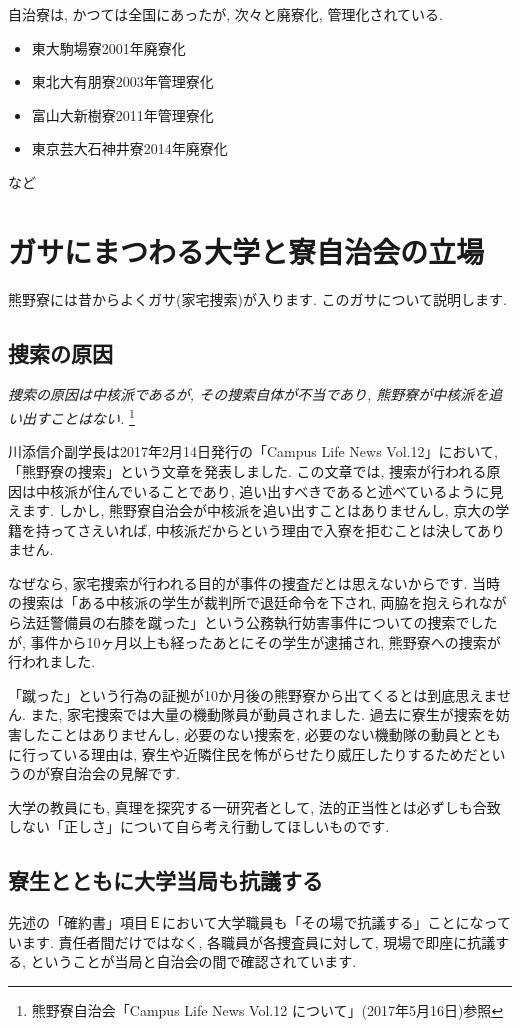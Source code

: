 \documentclass[10pt,b5jsbook,dvips,dvipdfmx,openany]{jsbook}
\theoremstyle{definition}
\begin{document}
		自治寮は, かつては全国にあったが, 次々と廃寮化, 管理化されている. 
		\begin{itemize}
		\item 東大駒場寮2001年廃寮化
		\item 東北大有朋寮2003年管理寮化
		\item 富山大新樹寮2011年管理寮化
		\item 東京芸大石神井寮2014年廃寮化
		\end{itemize}
		など




	\section{ガサにまつわる大学と寮自治会の立場}
	熊野寮には昔からよくガサ(家宅捜索)が入ります. このガサについて説明します. 

		\subsection{捜索の原因}
		\emph{捜索の原因は中核派であるが, その捜索自体が不当であり, 熊野寮が中核派を追い出すことはない. }\footnote{熊野寮自治会「Campus Life News Vol.12 について」(2017年5月16日)参照}

 		川添信介副学長は2017年2月14日発行の「Campus Life News Vol.12」において, 「熊野寮の捜索」という文章を発表しました. この文章では, 捜索が行われる原因は中核派が住んでいることであり, 追い出すべきであると述べているように見えます. しかし, 熊野寮自治会が中核派を追い出すことはありませんし, 京大の学籍を持ってさえいれば, 中核派だからという理由で入寮を拒むことは決してありません. 
 
		なぜなら, 家宅捜索が行われる目的が事件の捜査だとは思えないからです. 当時の捜索は「ある中核派の学生が裁判所で退廷命令を下され, 両脇を抱えられながら法廷警備員の右膝を蹴った」という公務執行妨害事件についての捜索でしたが, 事件から10ヶ月以上も経ったあとにその学生が逮捕され, 熊野寮への捜索が行われました. 

		「蹴った」という行為の証拠が10か月後の熊野寮から出てくるとは到底思えません. また, 家宅捜索では大量の機動隊員が動員されました. 過去に寮生が捜索を妨害したことはありませんし, 必要のない捜索を, 必要のない機動隊の動員とともに行っている理由は, 寮生や近隣住民を怖がらせたり威圧したりするためだというのが寮自治会の見解です. 

 		大学の教員にも, 真理を探究する一研究者として, 法的正当性とは必ずしも合致しない「正しさ」について自ら考え行動してほしいものです. 

		\subsection{寮生とともに大学当局も抗議する}
		先述の「確約書」項目Ｅにおいて大学職員も「その場で抗議する」ことになっています. 責任者間だけではなく, 各職員が各捜査員に対して, 現場で即座に抗議する, ということが当局と自治会の間で確認されています. 
\end{document}
